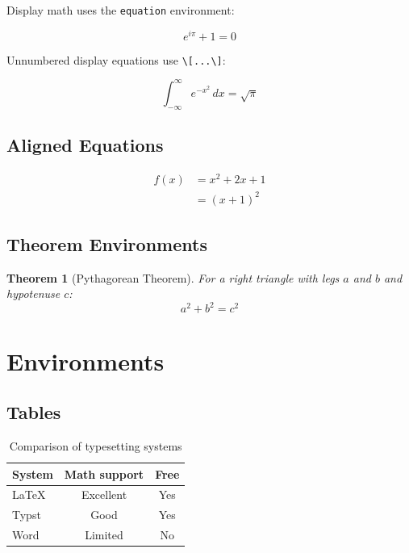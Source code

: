 \documentclass[12pt,a4paper]{article}
\begin{document}
Display math uses the \texttt{equation} environment:

\begin{equation}
  \label{eq:euler}
  e^{i\pi} + 1 = 0
\end{equation}

Unnumbered display equations use \verb|\[...\]|:

\[
  \int_{-\infty}^{\infty} e^{-x^2} \, dx = \sqrt{\pi}
\]

\subsection{Aligned Equations}

\begin{align}
  f(x) &= x^2 + 2x + 1 \\
       &= (x + 1)^2
\end{align}

\subsection{Theorem Environments}

\newtheorem{theorem}{Theorem}
\newtheorem{lemma}[theorem]{Lemma}

\begin{theorem}[Pythagorean Theorem]
  For a right triangle with legs $a$ and $b$ and hypotenuse $c$:
  \[
    a^2 + b^2 = c^2
  \]
\end{theorem}

\section{Environments}
\label{sec:environments}

\subsection{Tables}

\begin{table}[ht]
  \centering
  \caption{Comparison of typesetting systems}
  \label{tab:comparison}
  \begin{tabular}{lcc}
    \toprule
    System    & Math support & Free \\
    \midrule
    \LaTeX{}  & Excellent    & Yes  \\
    Typst     & Good         & Yes  \\
    Word      & Limited      & No   \\
    \bottomrule
  \end{tabular}
\end{table}
\end{document}
